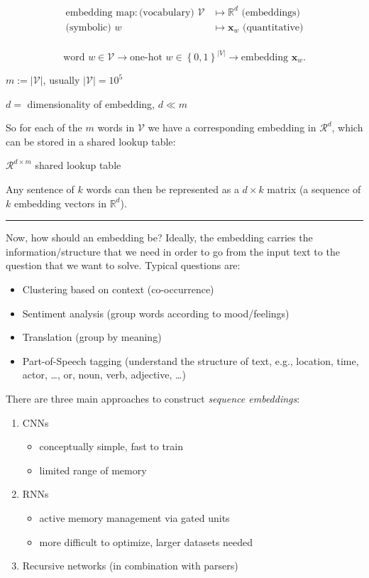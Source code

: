 \documentclass[a2paper,8pt]{extarticle}
\newcommand\pro{\item[$+$]}
\newcommand\con{\item[$-$]}
\newcommand{\R}{\mathbb{R}}
\newcommand{\cR}{\mathcal{R}}
\newcommand{\cV}{\mathcal{V}}
\newcommand{\set}[1]{\left\{ #1 \right\}}
\newcommand{\card}[1]{\left\lvert #1 \right\rvert}
\renewcommand{\vec}[1]{\mathbf{#1}}
\newcommand{\vx}{\vec{x}}
\newcommand{\sep}{\vspace{0pt}\noindent\hrule\vspace{0pt}}
\newcommand{\ssep}{\hdashrule[1.1ex]{\linewidth}{0.1pt}{0.3mm}\vspace{-6pt}}
\newcommand{\sep}{\vspace{5pt}\noindent\hrule\vspace{5pt}}
\newcommand{\ssep}{\hdashrule[1.1ex]{\linewidth}{0.1pt}{0.3mm}\vspace{-3pt}}
\begin{document}
\begin{landscape}
\begin{multicols*}{7}
\begin{align*}
\text{embedding map}\colon
\text{(vocabulary) }\cV&\mapsto\R^d\text{ (embeddings)}\\
\text{(symbolic) }w&\mapsto \vx_{w}\text{ (quantitative)}\\
\end{align*}

\[
\text{word }w\in\cV
\to
\text{one-hot }w\in\set{0,1}^{\card{V}}
\to
\text{embedding } \vx_{w}.
\]

$m:=\card{\cV}$, usually $\card{\cV}=10^5$

$d=$ dimensionality of embedding, $d\ll m$ 

So for each of the $m$ words in $\cV$ we have a corresponding embedding in
$\cR^d$, which can be stored in a shared lookup table:

$\cR^{d\times m}$ shared lookup table

Any sentence of $k$ words can then be represented as a $d\times k$ matrix (a
sequence of $k$ embedding vectors in $\R^d$).

\sep

Now, how should an embedding be? Ideally, the embedding carries the
information/structure that we need in order to go from the input text to the
question that we want to solve. Typical questions are:
\begin{itemize}
  \item Clustering based on context (co-occurrence)
  \item Sentiment analysis (group words according to mood/feelings)
  \item Translation (group by meaning)
  \item Part-of-Speech tagging (understand the structure of text, e.g.,
  location, time, actor, \ldots, or, noun, verb, adjective, \ldots) 
\end{itemize}

\ssep

There are three main approaches to construct \emph{sequence embeddings}:
\begin{enumerate}
  \item CNNs
  \begin{itemize}
    \pro conceptually simple, fast to train
    \con limited range of memory 
  \end{itemize}
  \item RNNs
  \begin{itemize}
    \pro active memory management via gated units
    \con more difficult to optimize, larger datasets needed 
  \end{itemize}
  \item Recursive networks (in combination with parsers)
\end{enumerate}




\end{multicols*}
\end{landscape}
\end{document}
